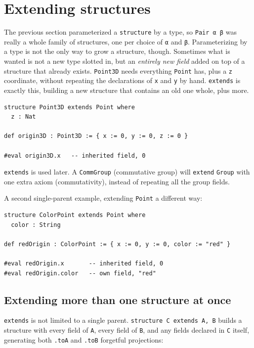 \section{Extending structures}\label{sec:03-functions-and-structures:03-extending-structures:1}

The previous section parameterized a \texttt{structure} by a type, so \texttt{Pair α β} was really a whole family of structures, one per choice of \texttt{α} and \texttt{β}. Parameterizing by a type is not the only way to grow a structure, though. Sometimes what is wanted is not a new type slotted in, but an \emph{entirely new field} added on top of a structure that already exists. \texttt{Point3D} needs everything \texttt{Point} has, plus a \texttt{z} coordinate, without repeating the declarations of \texttt{x} and \texttt{y} by hand. \texttt{extends} is exactly this, building a new structure that contains an old one whole, plus more.

\begin{lstlisting}
structure Point3D extends Point where
  z : Nat

def origin3D : Point3D := { x := 0, y := 0, z := 0 }

#eval origin3D.x   -- inherited field, 0
\end{lstlisting}

\texttt{extends} is used later. A \texttt{CommGroup} (commutative group) will \texttt{extend} \texttt{Group} with one extra axiom (commutativity), instead of repeating all the group fields.

A second single-parent example, extending \texttt{Point} a different way:

\begin{lstlisting}
structure ColorPoint extends Point where
  color : String

def redOrigin : ColorPoint := { x := 0, y := 0, color := "red" }

#eval redOrigin.x       -- inherited field, 0
#eval redOrigin.color   -- own field, "red"
\end{lstlisting}

\subsection{Extending more than one structure at once}\label{sec:03-functions-and-structures:03-extending-structures:2}

\texttt{extends} is not limited to a single parent. \texttt{structure C extends A, B} builds a structure with every field of \texttt{A}, every field of \texttt{B}, and any fields declared in \texttt{C} itself, generating both \texttt{.toA} and \texttt{.toB} forgetful projections:

